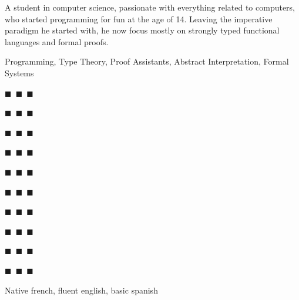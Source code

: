 \documentclass[a4paper,11pt]{extarticle}
\newcommand{\skdabb} {\colorbox{ForestGreen!80!white}{\color{skcol}$\blacksquare$~\color{noskcol}$\blacksquare$~\color{noskcol}$\blacksquare$}}
\newcommand{\skmore} {\colorbox{ForestGreen!80!white}{\color{skcol}$\blacksquare$~\color{skcol}$\blacksquare$~\color{noskcol}$\blacksquare$}}
\newcommand{\skexp}  {\colorbox{ForestGreen!80!white}{\color{skcol}$\blacksquare$~\color{skcol}$\blacksquare$~\color{skcol}$\blacksquare$}}
\begin{document}
\begin{minipage}[c]{0.35\linewidth}
\begin{tcolorbox}
        \vspace{0.3cm}

        A student in computer science, passionate with everything related to
        computers, who started programming for fun at the age of 14. Leaving
        the imperative paradigm he started with, he now focus mostly on
        strongly typed functional languages and formal proofs.

        \vspace{0.3cm}

        Programming, Type Theory, Proof Assistants,
        Abstract Interpretation, Formal Systems


        \vspace{0.3cm}
        \begin{description}\setlength{\itemsep}{0em}
          \item[C++]\hfill\skexp
          \item[Rust]\hfill\skexp
          \item[Shell]\hfill\skexp
          \item[Nix]\hfill\skexp
          \item[Haskell]\hfill\skmore
          \item[\LaTeX]\hfill\skmore
          \item[Coq]\hfill\skmore
          \item[Prolog]\hfill\skmore
          \item[OCaml]\hfill\skmore
          \item[Python]\hfill\skdabb
        \end{description}

        \vspace{0cm}

        Native french, fluent english, basic spanish


    \end{tcolorbox}\end{minipage}
    \hfill
\end{document}

